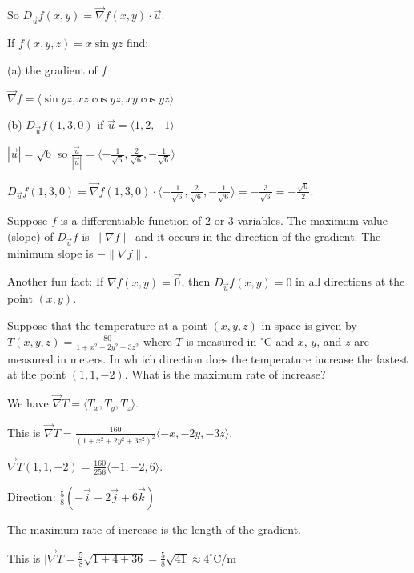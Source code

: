 \documentclass[../calc3.tex]{subfiles}
\begin{document}
So $D_{\vec{u}}f(x,y)=\vec{\nabla}f(x,y)\cdot \vec{u}$.

\begin{example}
    If $f(x,y,z)=x\sin yz$ find:

    (a) the gradient of $f$

    $\vec{\nabla}f=\langle \sin yz, xz\cos yz, xy\cos yz\rangle$

    (b) $D_{\vec{u}}f(1,3,0)$ if $\vec{u}=\langle 1,2,-1\rangle$

    $|\vec{u}|=\sqrt{6}$ so $\frac{\vec{u}}{|\vec{u}|}=\langle -\frac{1}{\sqrt{6}}, \frac{2}{\sqrt{6}}, -\frac{1}{\sqrt{6}}\rangle$

    $D_{\vec{u}}f(1,3,0)=\vec{\nabla}f(1,3,0)\cdot \langle -\frac{1}{\sqrt{6}}, \frac{2}{\sqrt{6}}, -\frac{1}{\sqrt{6}}\rangle = -\frac{3}{\sqrt{6}}=-\frac{\sqrt{6}}{2}$.
\end{example}

\begin{theorem}
    Suppose $f$ is a differentiable function of $2$ or $3$ variables. The maximum value (slope) of $D_{\vec{u}}f$ is $\| \nabla f\|$ and it occurs in the direction of the gradient. The minimum slope is $-\| \nabla f\|$.
\end{theorem}

Another fun fact: If $\nabla f(x,y)=\vec{0}$, then $D_{\vec{u}}f(x,y)=0$ in all directions at the point $(x,y)$.

\pagebreak
\begin{example}
    Suppose that the temperature at a point $(x,y,z)$ in space is given by $T(x,y,z)=\frac{80}{1+x^2+2y^2+3z^2}$ where $T$ is measured in $^{\circ}$C and $x$, $y$, and $z$ are measured in meters. In wh ich direction does the temperature increase the fastest at the point $(1,1,-2)$. What is the maximum rate of increase?

    We have $\vec{\nabla}T=\langle T_x, T_y,T_z\rangle$.

    This is $\vec{\nabla}T = \frac{160}{(1+x^2+2y^2+3z^2)^2}\langle -x,-2y,-3z\rangle$.

    $\vec{\nabla}T(1,1,-2)=\frac{160}{256}\langle -1,-2,6\rangle$.

    Direction: $\frac{5}{8}(-\vec{i}-2\vec{j}+6\vec{k})$

    The maximum rate of increase is the length of the gradient.

    This is $|\vec{\nabla}T = \frac{5}{8}\sqrt{1+4+36}=\frac{5}{8}\sqrt{41}\approx 4^{\circ}$C/m
\end{example}
\end{document}
